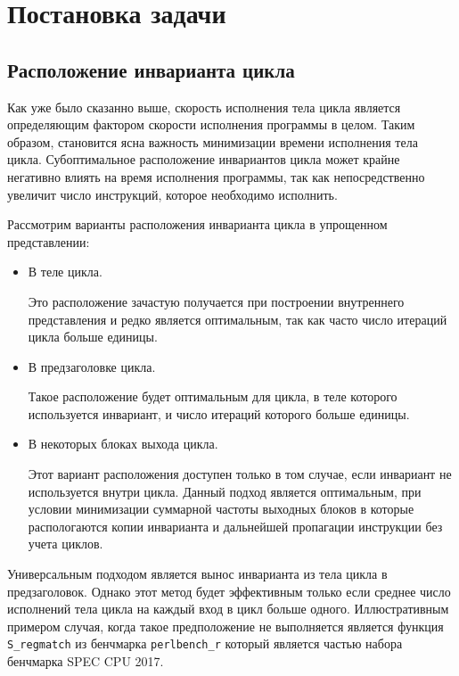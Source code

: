 \chapter{Постановка задачи}
\label{sec:Chapter1} 

\section{Расположение инварианта цикла}

Как уже было сказанно выше, скорость исполнения тела цикла является определяющим фактором скорости исполнения программы в целом.
Таким образом, становится ясна важность минимизации времени исполнения тела цикла.
Субоптимальное расположение инвариантов цикла может крайне негативно влиять на время исполнения программы, так как непосредственно увеличит число инструкций, которое необходимо исполнить.

Рассмотрим варианты расположения инварианта цикла в упрощенном представлении:
\begin{itemize}
    \item В теле цикла.

        Это расположение зачастую получается при построении внутреннего представления и редко является оптимальным, так как часто число итераций цикла больше единицы.

    \item В предзаголовке цикла.

        Такое расположение будет оптимальным для цикла, в теле которого используется инвариант, и число итераций которого больше единицы.

    \item В некоторых блоках выхода цикла.

        Этот вариант расположения доступен только в том случае, если инвариант не используется внутри цикла.
        Данный подход является оптимальным, при условии минимизации суммарной частоты выходных блоков в которые распологаются копии инварианта и дальнейшей пропагации инструкции без учета циклов.
\end{itemize}

Универсальным подходом является вынос инварианта из тела цикла в предзаголовок.
Однако этот метод будет эффективным только если среднее число исполнений тела цикла на каждый вход в цикл больше одного.
Иллюстративным примером случая, когда такое предположение не выполняется является функция \texttt{S\_regmatch} из бенчмарка \texttt{perlbench\_r} который является частью набора бенчмарка SPEC CPU\textsuperscript{\tiny\textregistered} 2017.

